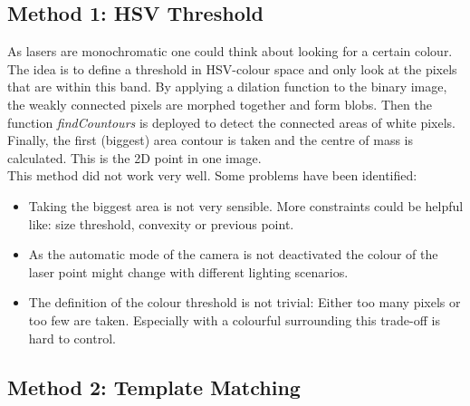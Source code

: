 \documentclass[./\jobname.tex]{subfiles}
\begin{document}
\subsection{Method 1: HSV Threshold}
As lasers are monochromatic one could think about looking for a certain colour. The idea is to define a threshold in HSV-colour space and only look at the pixels that are within this band. By applying a dilation function to the binary image, the weakly connected pixels are morphed together and form blobs. Then the function \textit{findCountours} is deployed to detect the connected areas of white pixels. Finally, the first (biggest) area contour is taken and the centre of mass is calculated. This is the 2D point in one image. \\
This method did not work very well. Some problems have been identified: 
\begin{itemize}
	\item Taking the biggest area is not very sensible. More constraints could be helpful like: size threshold, convexity or previous point.
	\item As the automatic mode of the camera is not deactivated the colour of the laser point might change with different lighting scenarios. 
	\item The definition of the colour threshold is not trivial: Either too many pixels or too few are taken. Especially with a colourful surrounding this trade-off is hard to control. 
\end{itemize}

\subsection{Method 2: Template Matching}
\end{document}
